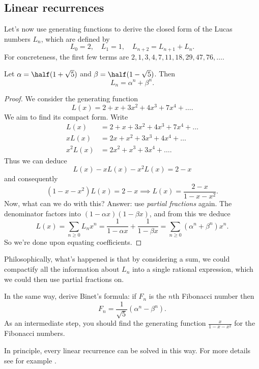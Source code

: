 \documentclass[11pt]{scrartcl}
\begin{document}
\subsection{Linear recurrences}
Let's now use generating functions to derive the closed form of
the Lucas numbers $L_n$, which are defined by
\[ L_0 = 2, \quad L_1 = 1, \quad L_{n+2} = L_{n+1} + L_n.\]
For concreteness, the first few terms are
$2, 1, 3, 4, 7, 11, 18, 29, 47, 76, \dots$.
\begin{theorem}
  Let $\alpha = \half(1+\sqrt5)$ and $\beta=\half(1-\sqrt5)$.
  Then
  \[ L_n = \alpha^n + \beta^n. \]
\end{theorem}
\begin{proof}
  We consider the generating function
  \[ L(x) = 2 + x + 3x^2 + 4x^3 + 7x^4 + \dots. \]
  We aim to find its compact form.
  Write
  \begin{align*}
    L(x) &= 2 + x + 3x^2 + 4x^3 + 7x^4 + \dots \\
    xL(x) &= 2x + x^2 + 3x^3 + 4x^4 + \dots \\
    x^2L(x) &= 2x^2 + x^3 + 3x^4 + \dots.
  \end{align*}
  Thus we can deduce
  \[ L(x) - xL(x) - x^2L(x) = 2-x \]
  and consequently
  \[ (1-x-x^2)L(x) = 2-x
    \implies L(x) = \frac{2-x}{1-x-x^2}. \]
  Now, what can we do with this?
  Answer: use \emph{partial fractions} again.
  The denominator factors into $(1-\alpha x)(1-\beta x)$,
  and from this we deduce
  \[
    L(x) = \sum_{n \ge 0} L_n x^n
    = \frac{1}{1-\alpha x} + \frac{1}{1 - \beta x}
    = \sum_{n \ge 0} \left( \alpha^n + \beta^n \right)x^n.
  \]
  So we're done upon equating coefficients.
\end{proof}
Philosophically, what's happened is that by considering a sum,
we could compactify all the information about $L_n$ into a single
rational expression, which we could then use partial fractions on.

\begin{exercise}
  In the same way, derive Binet's formula:
  if $F_n$ is the $n$th Fibonacci number then
  \[ F_n = \frac{1}{\sqrt5}(\alpha^n-\beta^n). \]
  As an intermediate step,
  you should find the generating function $\frac{x}{1-x-x^2}$
  for the Fibonacci numbers.
\end{exercise}

In principle, every linear recurrence can be solved in this way.
For more details see for example \cite{ref:linear}.
\end{document}
